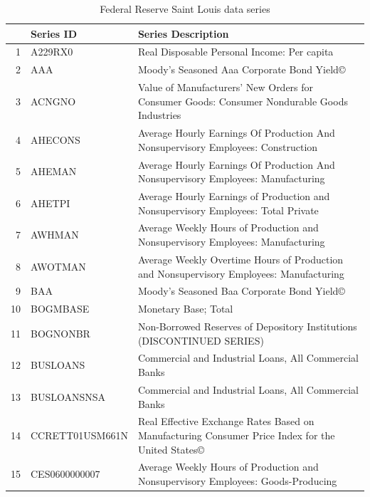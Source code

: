 \documentclass[12pt]{article}
\begin{document}
\begin{table}[ht]
\caption{Federal Reserve Saint Louis data series}
\label{fred data}
\centering
\begin{tabular}{r|p{4cm}p{11cm}}
  \hline
  & Series ID & Series Description \\ 
  \hline
	1 & A229RX0 & Real Disposable Personal Income: Per capita \\ 
	\hline
	2 & AAA & Moody's Seasoned Aaa Corporate Bond Yield© \\ 
	\hline
	3 & ACNGNO & Value of Manufacturers' New Orders for Consumer Goods: Consumer Nondurable Goods Industries \\ 
	\hline
	4 & AHECONS & Average Hourly Earnings Of Production And Nonsupervisory Employees: Construction \\ 
	\hline
	5 & AHEMAN & Average Hourly Earnings Of Production And Nonsupervisory Employees: Manufacturing \\ 
	\hline
	  6 & AHETPI & Average Hourly Earnings of Production and Nonsupervisory Employees: Total Private \\ 
	\hline
	7 & AWHMAN & Average Weekly Hours of Production and Nonsupervisory Employees: Manufacturing \\ 
	\hline
	8 & AWOTMAN & Average Weekly Overtime Hours of Production and Nonsupervisory Employees: Manufacturing \\ 
	\hline
	9 & BAA & Moody's Seasoned Baa Corporate Bond Yield© \\ 
	\hline
    10 & BOGMBASE & Monetary Base; Total \\ 
    \hline
	11 & BOGNONBR & Non-Borrowed Reserves of Depository Institutions (DISCONTINUED SERIES) \\ 
	\hline
	12 & BUSLOANS & Commercial and Industrial Loans, All Commercial Banks \\ 
	\hline
	13 & BUSLOANSNSA & Commercial and Industrial Loans, All Commercial Banks \\ 
	\hline
	14 & CCRETT01USM661N & Real Effective Exchange Rates Based on Manufacturing Consumer Price Index for the United States© \\ 
	\hline
	15 & CES0600000007 & Average Weekly Hours of Production and Nonsupervisory Employees: Goods-Producing \\ 
	\hline

\end{tabular}
\end{table}
\end{document}

